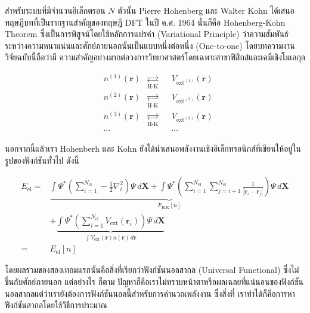 สำหรับระบบที่มีจำนวนอิเล็กตรอน $N$ ตัวนั้น Pierre Hohenberg และ Walter Kohn ได้เสนอทฤษฎีบทที่เป็นรากฐานสำคัญของทฤษฎี DFT 
ในปี ค.ศ. 1964 นั่นก็คือ Hohenberg-Kohn Theorem\autocite{hohenberg1964} ซึ่งเป็นการพิสูจน์โดยใช้หลักการแปรค่า (Variational 
Principle) ว่าความสัมพันธ์ระหว่างความหนาแน่นและศักย์ภายนอกนั้นเป็นแบบหนึ่งต่อหนึ่ง (One-to-one) โดยบทความงานวิจัยฉบับนี้ถือว่ามี%
ความสำคัญอย่างมากต่อวงการวิทยาศาสตร์โดยเฉพาะสาขาฟิสิกส์และเคมีเชิงโมเลกุล

\begin{framed}
    \centering
    \begin{align*}
        &n^{(1)}(\bm{r}) &\underset{\text{H-K}}{\rightleftarrows} &&V_{\text{ext}^{(1)}}(\bm{r}) \\[0.5ex]
        &n^{(2)}(\bm{r}) &\underset{\text{H-K}}{\rightleftarrows} &&V_{\text{ext}^{(2)}}(\bm{r}) \\[0.5ex]
        &n^{(3)}(\bm{r}) &\underset{\text{H-K}}{\rightleftarrows} &&V_{\text{ext}^{(3)}}(\bm{r}) \\[0.5ex]
        &\cdots & &&\cdots 
    \end{align*}
\end{framed}

นอกจากนี้แล้วเรา Hohenberh และ Kohn ยังได้นำเสนอพลังงานเชิงอิเล็กทรอนิกส์ที่เขียนให้อยู่ในรูปของฟังก์ชันทั่วไป ดังนี้

\begin{align}\label{eq:ener_univer_ext_pot}
    E_{\text{el}} =& \underbrace{\int \Psi^{\ast} 
    \left ( \sum^{N_{\text{el}}}_{i=1} -\frac{1}{2} \nabla^{2}_{i} \right ) 
    \Psi \, d\bm{X} 
    + \int \Psi^{\ast} 
    \left ( \sum^{N_{\text{el}}}_{i=1} \sum^{N_{\text{el}}}_{j=i+1} \frac{1}{|\bm{r}_{i}-\bm{r}_{j}|} \right ) 
    \Psi \, d\bm{X}}_{\textstyle F_{\text{H-K}}[n]} \nonumber \\
    &+ \underbrace{\int \Psi^{\ast}  
    \left ( \sum^{N_{\text{el}}}_{i=1} V_{\text{ext}}(\bm{r}_{i}) \right ) 
    \Psi \, d\bm{X}%
    }_{\textstyle \int V_{\text{ext}}(\bm{r}) n(\bm{r}) \, d\bm{r}} \\
    =& E_{\text{el}}[n]
\end{align}

\noindent โดยผลรวมของสองเทอมแรกนั้นคือสิ่งที่เรียกว่าฟังก์ชันนอลสากล (Universal Functional) ซึ่งไม่ขึ้นกับศักย์ภายนอก แต่อย่างไร%
ก็ตาม ปัญหาก็คือเราไม่ทราบหน้าตาหรือผลเฉลยที่แน่นอนของฟังก์ชันนอลสากลแต่ว่าเรายังต้องการฟังก์ชันนอลนี้สำหรับการคำนวณพลังงาน ซึ่งสิ่งที่%
เราทำได้ก็คือการหาฟังก์ชันสากลโดยใช้วิธีการประมาณ


